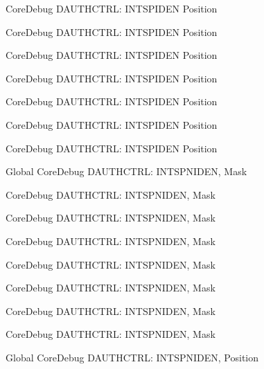 \begin{DoxyRefList}
\label{deprecated__deprecated000540}%
%
Core\+Debug DAUTHCTRL\+: INTSPIDEN Position 

\label{deprecated__deprecated000219}%
%
Core\+Debug DAUTHCTRL\+: INTSPIDEN Position 

\label{deprecated__deprecated000642}%
%
Core\+Debug DAUTHCTRL\+: INTSPIDEN Position 

\label{deprecated__deprecated000361}%
%
Core\+Debug DAUTHCTRL\+: INTSPIDEN Position 

\label{deprecated__deprecated000282}%
%
Core\+Debug DAUTHCTRL\+: INTSPIDEN Position 

\label{deprecated__deprecated000143}%
%
Core\+Debug DAUTHCTRL\+: INTSPIDEN Position 

\label{deprecated__deprecated000089}%
%
Core\+Debug DAUTHCTRL\+: INTSPIDEN Position  
\item[Global \doxylink{group___c_m_s_i_s___s_c_b_gadad0bf68d32cba49c1ea7534122c2752}{Core\+Debug\+\_\+\+DAUTHCTRL\+\_\+\+INTSPNIDEN\+\_\+\+Msk} ]\label{deprecated__deprecated000140}%
%
Core\+Debug DAUTHCTRL\+: INTSPNIDEN, Mask 

\label{deprecated__deprecated000639}%
%
Core\+Debug DAUTHCTRL\+: INTSPNIDEN, Mask 

\label{deprecated__deprecated000216}%
%
Core\+Debug DAUTHCTRL\+: INTSPNIDEN, Mask 

\label{deprecated__deprecated000434}%
%
Core\+Debug DAUTHCTRL\+: INTSPNIDEN, Mask 

\label{deprecated__deprecated000358}%
%
Core\+Debug DAUTHCTRL\+: INTSPNIDEN, Mask 

\label{deprecated__deprecated000086}%
%
Core\+Debug DAUTHCTRL\+: INTSPNIDEN, Mask 

\label{deprecated__deprecated000537}%
%
Core\+Debug DAUTHCTRL\+: INTSPNIDEN, Mask 

\label{deprecated__deprecated000279}%
%
Core\+Debug DAUTHCTRL\+: INTSPNIDEN, Mask  
\item[Global \doxylink{group___c_m_s_i_s___s_c_b_gaf733a36e6b4717a604f7d77c05dfceb4}{Core\+Debug\+\_\+\+DAUTHCTRL\+\_\+\+INTSPNIDEN\+\_\+\+Pos} ]\label{deprecated__deprecated000357}%
%
Core\+Debug DAUTHCTRL\+: INTSPNIDEN, Position 


\end{DoxyRefList}
